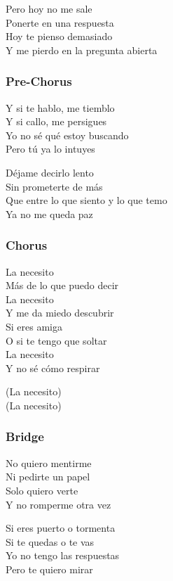 \documentclass[]{article}
\begin{document}
Pero hoy no me sale\\
Ponerte en una respuesta\\
Hoy te pienso demasiado\\
Y me pierdo en la pregunta abierta

\subsubsection{Pre-Chorus}\label{pre-chorus-23}

Y si te hablo, me tiemblo\\
Y si callo, me persigues\\
Yo no sé qué estoy buscando\\
Pero tú ya lo intuyes

Déjame decirlo lento\\
Sin prometerte de más\\
Que entre lo que siento y lo que temo\\
Ya no me queda paz

\subsubsection{Chorus}\label{chorus-39}

La necesito\\
Más de lo que puedo decir\\
La necesito\\
Y me da miedo descubrir\\
Si eres amiga\\
O si te tengo que soltar\\
La necesito\\
Y no sé cómo respirar

(La necesito)\\
(La necesito)

\subsubsection{Bridge}\label{bridge-9}

No quiero mentirme\\
Ni pedirte un papel\\
Solo quiero verte\\
Y no romperme otra vez

Si eres puerto o tormenta\\
Si te quedas o te vas\\
Yo no tengo las respuestas\\
Pero te quiero mirar
\end{document}
